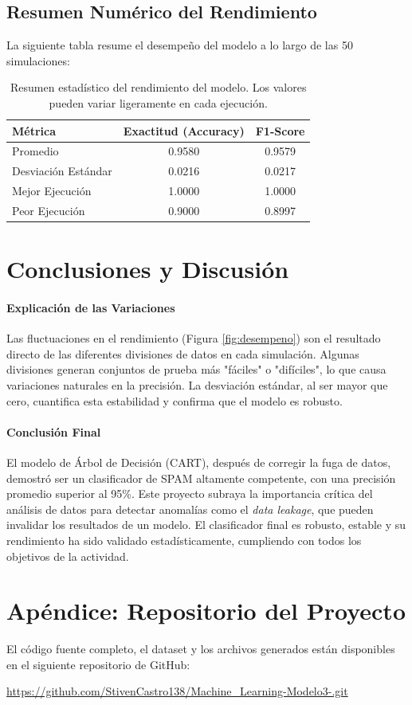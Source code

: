 \documentclass[12pt, a4paper]{article}
\begin{document}
\subsection{Resumen Numérico del Rendimiento}
La siguiente tabla resume el desempeño del modelo a lo largo de las 50 simulaciones:

\begin{table}[H]
    \centering
    \begin{tabular}{lcc}
        \toprule
        \textbf{Métrica} & \textbf{Exactitud (Accuracy)} & \textbf{F1-Score} \\
        \midrule
        Promedio & 0.9580 & 0.9579 \\
        Desviación Estándar & 0.0216 & 0.0217 \\
        Mejor Ejecución & 1.0000 & 1.0000 \\
        Peor Ejecución & 0.9000 & 0.8997 \\
        \bottomrule
    \end{tabular}
    \caption{Resumen estadístico del rendimiento del modelo. Los valores pueden variar ligeramente en cada ejecución.}
    \label{tab:resultados}
\end{table}

\section{Conclusiones y Discusión}

\paragraph{Explicación de las Variaciones} Las fluctuaciones en el rendimiento (Figura \ref{fig:desempeno}) son el resultado directo de las diferentes divisiones de datos en cada simulación. Algunas divisiones generan conjuntos de prueba más "fáciles" o "difíciles", lo que causa variaciones naturales en la precisión. La desviación estándar, al ser mayor que cero, cuantifica esta estabilidad y confirma que el modelo es robusto.

\paragraph{Conclusión Final} El modelo de Árbol de Decisión (CART), después de corregir la fuga de datos, demostró ser un clasificador de SPAM altamente competente, con una precisión promedio superior al 95\%. Este proyecto subraya la importancia crítica del análisis de datos para detectar anomalías como el \textit{data leakage}, que pueden invalidar los resultados de un modelo. El clasificador final es robusto, estable y su rendimiento ha sido validado estadísticamente, cumpliendo con todos los objetivos de la actividad.

\section*{Apéndice: Repositorio del Proyecto}
El código fuente completo, el dataset y los archivos generados están disponibles en el siguiente repositorio de GitHub:

\url{https://github.com/StivenCastro138/Machine_Learning-Modelo3-.git}

\newpage
\nocite{*}
\printbibliography[title={Referencias}]
\end{document}
